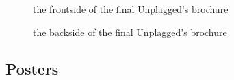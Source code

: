 \begin{figure}[!h]
  \centering
  \caption{the frontside of the final Unplagged's brochure}
  \label{fig:brochure_final_frontside}
\end{figure}

\begin{figure}[!h]
  \centering
  \caption{the backside of the final Unplagged's brochure}
  \label{fig:brochure_final_backside}
\end{figure}

\pagebreak 

\subsection{Posters}

